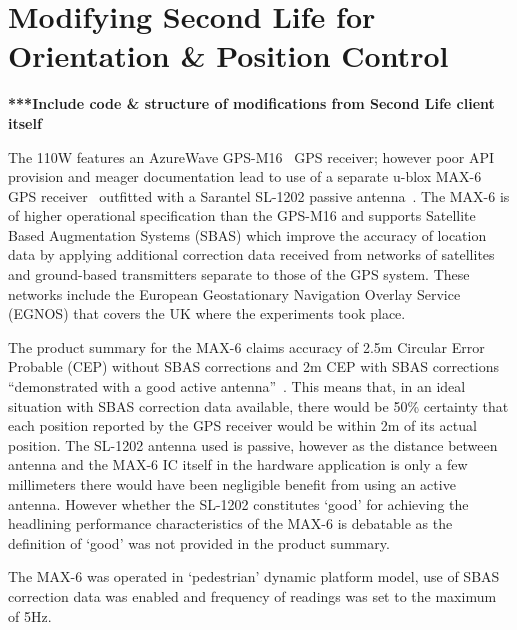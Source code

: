 \section{Modifying Second Life for Orientation \& Position Control}


\textbf{***Include code \& structure of modifications from Second Life client itself}

The 110W features an AzureWave GPS-M16~\cite{AzureWave} GPS receiver; however poor API provision and meager documentation lead to use of a separate u-blox MAX-6 GPS receiver~\cite{U-bloxAG} outfitted with a Sarantel SL-1202 passive antenna~\cite{Sarantel}. The MAX-6 is of higher operational specification than the GPS-M16 and supports Satellite Based Augmentation Systems (SBAS) which improve the accuracy of location data by applying additional correction data received from networks of satellites and ground-based transmitters separate to those of the GPS system. These networks include the European Geostationary Navigation Overlay Service (EGNOS) that covers the UK where the experiments took place.

The product summary for the MAX-6 claims accuracy of 2.5m Circular Error Probable (CEP) without SBAS corrections and 2m CEP with SBAS corrections ``demonstrated with a good active antenna''~\cite{U-bloxAG2012}. This means that, in an ideal situation with SBAS correction data available, there would be 50\% certainty that each position reported by the GPS receiver would be within 2m of its actual position. The SL-1202 antenna used is passive, however as the distance between antenna and the MAX-6 IC itself in the hardware application is only a few millimeters there would have been negligible benefit from using an active antenna. However whether the SL-1202 constitutes `good' for achieving the headlining performance characteristics of the MAX-6 is debatable as the definition of `good' was not provided in the product summary.

The MAX-6 was operated in `pedestrian' dynamic platform model, use of SBAS correction data was enabled and frequency of readings was set to the maximum of 5Hz.

